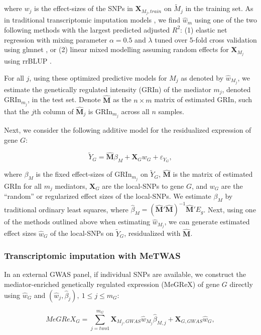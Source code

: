\noindent where $w_j$ is the effect-sizes of
the SNPs in $\mathbf{X}_{M_j,train}$ on $\tilde{M}_j$
in the training set.
As in traditional transcriptomic
imputation models \cite{Gamazon2015,Gusev2016},
we find $\hat{w}_m$ using
one of the two following methods
with the largest predicted adjusted $R^2$: 
(1) elastic net regression with mixing parameter $\alpha = 0.5$
and $\lambda$ tuned over 5-fold cross validation
using glmnet \cite{Friedman2010}, or
(2) linear mixed modelling assuming random effects
for $\mathbf{X}_{M_j}$ using rrBLUP \cite{Endelman2011}.

For all $j$, using these optimized predictive
models for $M_j$ as denoted
by $\hat{w}_{M_j}$, 
we estimate the genetically regulated
intensity (GRIn) of the mediator $m_j$, denoted
GRIn$_{m_j}$, in the test set. Denote
$\mathbf{\hat{M}}$ as the $n \times m$
matrix of estimated GRIn, such that
the $j$th column of $\mathbf{\hat{M}}_j$ is
GRIn$_{m_j}$ across all $n$ samples. 

Next, we consider
the following additive model for
the residualized expression of gene $G$:

$$\tilde{Y}_G = \mathbf{\hat{M}}\beta_M + \mathbf{X}_Gw_G + \varepsilon_{Y_G},$$

\noindent where $\beta_M$ is the fixed effect-sizes
of GRIn$_{m_j}$ on $\tilde{Y}_G$, $\hat{\mathbf{M}}$
is the matrix of estimated GRIn for
all $m_j$ mediators, $\mathbf{X}_G$
are the local-SNPs to gene $G$, and $w_G$
are the ``random'' or regularized 
effect sizes of the local-SNPs.
We estimate $\beta_M$ by
traditional ordinary least squares, where
$\hat{\beta}_M = \left(\mathbf{\hat{M}}'\mathbf{\hat{M}}\right)^{-1}\mathbf{\hat{M}}'E_g$.
Next, using one of the methods outlined above
when estimating $\hat{w}_{M_j}$, we
can generate estimated effect sizes $\hat{w}_G$ 
of the local-SNPs on $\tilde{Y}_G$, residualized
with $\hat{\mathbf{M}}$.

\subsubsection{Transcriptomic imputation with MeTWAS}
In an external GWAS panel, if individual SNPs are 
available, we construct the mediator-enriched genetically regulated
expression (MeGReX) of gene $G$
directly using $\hat{w}_G$ and $(\hat{w}_j,\hat{\beta}_j),~1 \leq j \leq m_G$:

$$MeGReX_G = \sum_{j =two 1}^{m_G}{\mathbf{X}_{M_j,GWAS}\hat{w}_{M_j}\hat{\beta}_{M,j}} + 
\mathbf{X}_{G,GWAS}\hat{w}_G,$$

